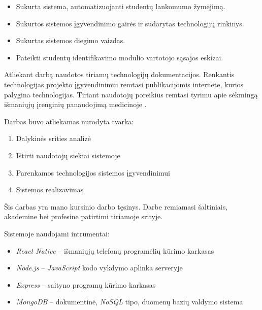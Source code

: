 \documentclass{VUMIFPSbakalaurinis}
\begin{document}

\begin{itemize}
	\item Sukurta sistema, automatizuojanti studentų lankomumo žymėjimą.
	\item Sukurtos sistemos įgyvendinimo gairės ir sudarytas technologijų rinkinys.
	\item Sukurtas sistemos diegimo vaizdas.
	\item Pateikti studentų identifikavimo modulio vartotojo sąsajos eskizai.
\end{itemize}


Atliekant darbą naudotos tiriamų technologijų dokumentacijos. Renkantis technologijas projekto įgyvendinimui remtasi publikacijomis internete, kurios palygina technologijas. Tiriant naudotojų poreikius remtasi tyrimu apie sėkmingą išmaniųjų įrenginių panaudojimą medicinoje \cite{mhealth}.


Darbas buvo atliekamas nurodyta tvarka:

\begin{enumerate}
    \item Dalykinės srities analizė
    \item Ištirti naudotojų siekiai sistemoje
    \item Parenkamos technologijos sistemos įgyvendinimui
    \item Sistemos realizavimas
\end{enumerate}


Šis darbas yra mano kursinio darbo tęsinys. Darbe remiamasi šaltiniais, akademine bei profesine patirtimi tiriamoje srityje.


Sistemoje naudojami intrumentai:

\begin{itemize}
    \item \textit{React Native} – išmaniųjų telefonų programėlių kūrimo karkasas
    \item \textit{Node.js} – \textit{JavaScript} kodo vykdymo aplinka serveryje
    \item \textit{Express} – saityno programų kūrimo karkasas
    \item \textit{MongoDB} – dokumentinė, \textit{NoSQL} tipo, duomenų bazių valdymo sistema
\end{itemize}
\end{document}
